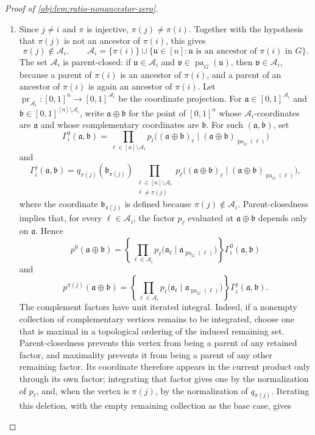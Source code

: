 \documentclass[11pt]{article}
\begin{document}
\begin{proof}[Proof of \cref{obj:lem:ratio-nonancestor-zero}]
\begin{enumerate}
\item Since \(j\ne i\) and \(\pi\) is injective, \(\pi(j)\ne\pi(i)\).  Together with the hypothesis that \(\pi(j)\) is not an ancestor of \(\pi(i)\), this gives
\[
\pi(j)\notin \mathcal A_i,
\qquad
\mathcal A_i
=
\{\pi(i)\}\cup
\{\mathfrak u\in[n]:\mathfrak u\text{ is an ancestor of }\pi(i)\text{ in }G\} .
\]
The set \(\mathcal A_i\) is parent-closed: if \(\mathfrak u\in\mathcal A_i\) and \(\mathfrak v\in\operatorname{pa}_G(\mathfrak u)\), then \(\mathfrak v\in\mathcal A_i\), because a parent of \(\pi(i)\) is an ancestor of \(\pi(i)\), and a parent of an ancestor of \(\pi(i)\) is again an ancestor of \(\pi(i)\).  Let \(\operatorname{pr}_{\mathcal A_i}:[0,1]^n\to[0,1]^{\mathcal A_i}\) be the coordinate projection.  For \(\mathfrak a\in[0,1]^{\mathcal A_i}\) and \(\mathfrak b\in[0,1]^{[n]\setminus\mathcal A_i}\), write \(\mathfrak a\oplus\mathfrak b\) for the point of \([0,1]^n\) whose \(\mathcal A_i\)-coordinates are \(\mathfrak a\) and whose complementary coordinates are \(\mathfrak b\).  For such \((\mathfrak a,\mathfrak b)\), set
\[
\Gamma_i^0(\mathfrak a,\mathfrak b)
=
\prod_{\ell\in[n]\setminus\mathcal A_i}
 p_\ell\bigl((\mathfrak a\oplus\mathfrak b)_\ell\mid
 (\mathfrak a\oplus\mathfrak b)_{\operatorname{pa}_G(\ell)}\bigr)
\]
and
\[
\Gamma_i^j(\mathfrak a,\mathfrak b)
=
q_{\pi(j)}(\mathfrak b_{\pi(j)})
\prod_{\substack{\ell\in[n]\setminus\mathcal A_i\\ \ell\ne\pi(j)}}
 p_\ell\bigl((\mathfrak a\oplus\mathfrak b)_\ell\mid
 (\mathfrak a\oplus\mathfrak b)_{\operatorname{pa}_G(\ell)}\bigr),
\]
where the coordinate \(\mathfrak b_{\pi(j)}\) is defined because \(\pi(j)\notin\mathcal A_i\).  Parent-closedness implies that, for every \(\ell\in\mathcal A_i\), the factor \(p_\ell\) evaluated at \(\mathfrak a\oplus\mathfrak b\) depends only on \(\mathfrak a\).  Hence
\[
p^0(\mathfrak a\oplus\mathfrak b)
=
\left\{
\prod_{\ell\in\mathcal A_i}
 p_\ell\bigl(\mathfrak a_\ell\mid
 \mathfrak a_{\operatorname{pa}_G(\ell)}\bigr)
\right\}
\Gamma_i^0(\mathfrak a,\mathfrak b)
\]
and
\[
p^{\pi(j)}(\mathfrak a\oplus\mathfrak b)
=
\left\{
\prod_{\ell\in\mathcal A_i}
 p_\ell\bigl(\mathfrak a_\ell\mid
 \mathfrak a_{\operatorname{pa}_G(\ell)}\bigr)
\right\}
\Gamma_i^j(\mathfrak a,\mathfrak b).
\]
The complement factors have unit iterated integral.  Indeed, if a nonempty collection of complementary vertices remains to be integrated, choose one that is maximal in a topological ordering of the induced remaining set.  Parent-closedness prevents this vertex from being a parent of any retained factor, and maximality prevents it from being a parent of any other remaining factor.  Its coordinate therefore appears in the current product only through its own factor; integrating that factor gives one by the normalization of \(p_\ell\), and, when the vertex is \(\pi(j)\), by the normalization of \(q_{\pi(j)}\).  Iterating this deletion, with the empty remaining collection as the base case, gives

\end{enumerate}
\end{proof}
\end{document}

